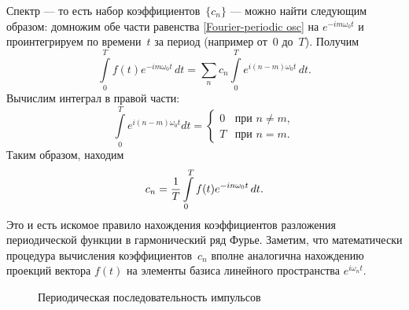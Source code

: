 Спектр --- то есть набор коэффициентов~$\{c_n\}$ ---
можно найти следующим образом: домножим обе части равенства
\eqref{Fourier-periodic osc} на $e^{-im\omega_0 t}$ и
проинтегрируем по времени~$t$ за период (например от~$0$ до~$T$). Получим
\begin{equation*}
    \int\limits_{0}^{T} f(t)e^{-im\omega_0t}\,dt=\sum_n c_n\int\limits_{0}^{T}
e^{i(n-m)\omega_0 t}\,dt.
\end{equation*}
Вычислим интеграл в правой части:
\begin{equation*}
    \int\limits_{0}^{T}e^{i(n-m)\omega_0 t}dt =
    \begin{cases}
        0 & \text{при~}n\ne m,\\
        T & \text{при~}n = m.
    \end{cases}
\end{equation*}
Таким образом, находим
\begin{equation}
    \eqmark{fourier-coeff}
    c_n=\frac{1}{T}\int\limits_{0}^{T} f(t)e^{-in\omega_0 t}\,dt.
\end{equation}
Это и есть искомое правило нахождения коэффициентов разложения периодической
функции в гармонический ряд Фурье. Заметим, что математически процедура вычисления 
коэффициентов~$c_n$ вполне аналогична нахождению проекций 
вектора $f(t)$ на элементы базиса линейного пространства $e^{i\omega_n t}$.


\begin{wrapfigure}[10]{o}{0.5\textwidth}
    \centering
    \caption{Периодическая последовательность импульсов}
\end{wrapfigure}

